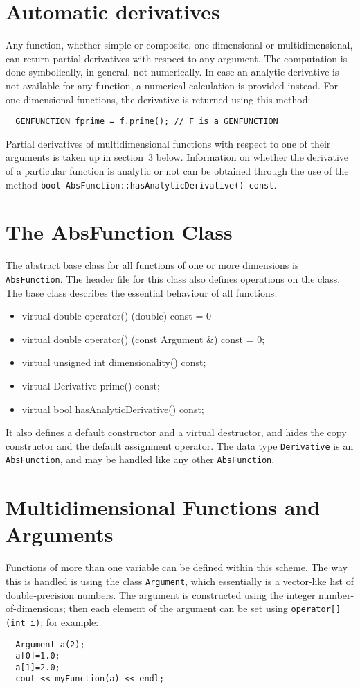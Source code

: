 \documentclass{report}
\begin{document}
\section{Automatic derivatives}

Any function, whether simple or composite, one dimensional or multidimensional,
can return partial derivatives with respect to any argument.  The computation is
done symbolically, in general, not numerically.  In case an analytic derivative
is not available for any function, a numerical calculation is provided instead.
For one-dimensional functions, the derivative is returned using this method:
\begin{verbatim}
  GENFUNCTION fprime = f.prime(); // F is a GENFUNCTION
\end{verbatim}
Partial derivatives of multidimensional functions with respect to one of their 
arguments is taken up in section~\ref{section:multidimensional} below.  Information 
on whether the derivative of a particular function is analytic or not can be
obtained through the use of the method \verb+bool AbsFunction::hasAnalyticDerivative() const+.

\section{The AbsFunction Class}

\noindent The abstract base class for all functions of one or more dimensions is 
\verb#AbsFunction#.  The header file for this class also defines operations 
on the class.  The base class describes the essential behaviour of all 
functions:
\begin{itemize}
\item{virtual double operator() (double) const = 0}
\item{virtual double operator() (const Argument \&) const = 0;}
\item{virtual unsigned int dimensionality() const;}
\item{virtual Derivative prime() const;}
\item{virtual bool hasAnalyticDerivative() const;}
\end{itemize}
It also defines a default constructor and a virtual destructor, and hides
the copy constructor and the default assignment operator.  The data type
\verb+Derivative+ is an \verb+AbsFunction+, and may be handled like any other
\verb+AbsFunction+.


\section {Multidimensional Functions and Arguments} 
\label{section:multidimensional}
\noindent Functions of more than one variable can be defined within this scheme.
The way this is handled is using the class \verb+Argument+, which essentially
is a vector-like list of double-precision numbers.  The argument is
constructed using the integer number-of-dimensions; then each element
of the argument can be set using \verb#operator[](int i)#; for example:
\begin {verbatim}
  Argument a(2);
  a[0]=1.0;
  a[1]=2.0;
  cout << myFunction(a) << endl;
\end{verbatim}
\end{document}
